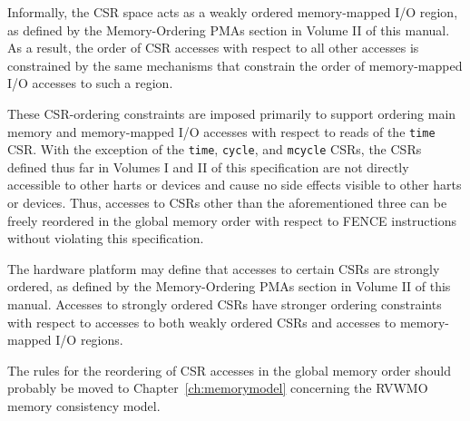 \begin{commentary}
Informally, the CSR space acts as a weakly ordered memory-mapped I/O region, as
defined by the Memory-Ordering PMAs section in Volume II of this manual. As a
result, the order of CSR accesses with respect to all other accesses is
constrained by the same mechanisms that constrain the order of memory-mapped
I/O accesses to such a region.

These CSR-ordering constraints are imposed primarily to support ordering main
memory and memory-mapped I/O accesses with respect to reads of the {\tt time}
CSR.  With the exception of the {\tt time}, {\tt cycle}, and {\tt mcycle} CSRs,
the CSRs defined thus far in Volumes I and II of this specification are not
directly accessible to other harts or devices and cause no side effects visible
to other harts or devices.  Thus, accesses to CSRs other than the
aforementioned three can be freely reordered in the global memory order
with respect to FENCE instructions
without violating this specification.
\end{commentary}

The hardware platform may define that accesses to certain CSRs are
strongly ordered, as defined by the Memory-Ordering PMAs section in Volume II
of this manual. Accesses to strongly ordered CSRs have stronger ordering
constraints with respect to accesses to both weakly ordered CSRs and accesses
to memory-mapped I/O regions.

\begin{commentary}
The rules for the reordering of CSR accesses in the global memory order
should probably be moved to Chapter~\ref{ch:memorymodel} concerning the
RVWMO memory consistency model.
\end{commentary}
